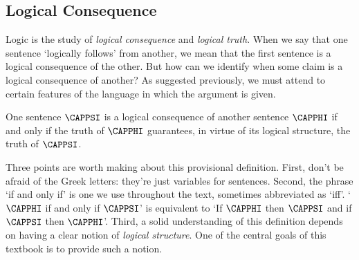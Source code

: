 \subsection{Logical Consequence}\label{Logical Consequence}

Logic is the study of \emph{logical consequence} and \emph{logical truth}. 
When we say that one sentence `logically follows' from another, we mean that the first sentence is a logical consequence of the other. 
But how can we identify when some claim is a logical consequence of another? 
As suggested previously, we must attend to certain features of the language in which the argument is given. 

One sentence $\CAPPSI$ is a logical consequence of another sentence $\CAPPHI$ if and only if the truth of $\CAPPHI$ guarantees, in virtue of its logical structure, the truth of $\CAPPSI$.

Three points are worth making about this provisional definition. First, don't be afraid of the Greek letters: they're just variables for sentences. Second, the phrase `if and only if' is one we use throughout the text, sometimes abbreviated as `iff'. `$\CAPPHI$ if and only if $\CAPPSI$' is equivalent to `If $\CAPPHI$ then $\CAPPSI$ and if $\CAPPSI$ then $\CAPPHI$'. Third, a solid understanding of this definition depends on having a clear notion of \emph{logical structure}. One of the central goals of this textbook is to provide such a notion.

